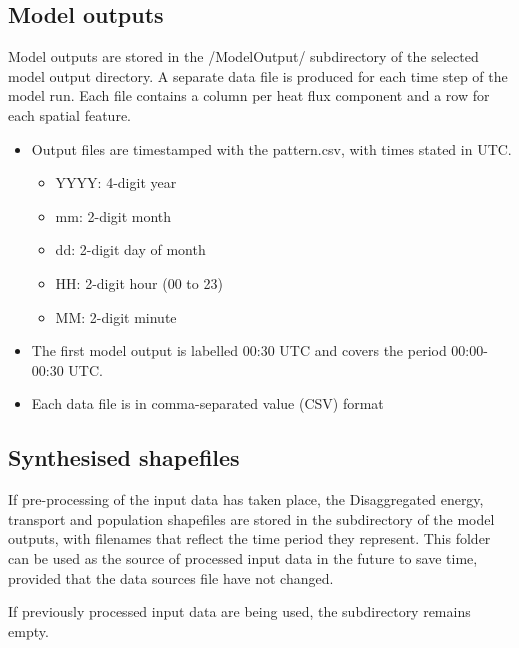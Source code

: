 \documentclass[letterpaper,10pt,english]{sphinxmanual}
\begin{document}
\subsection{Model outputs}
\label{\detokenize{OtherManuals/GQF_Manual:model-outputs}}
Model outputs are stored in the /ModelOutput/ subdirectory of the
selected model output directory. A separate data file is produced for
each time step of the model run. Each file contains a column per heat
flux component and a row for each spatial feature.
\begin{itemize}
\item {} 
Output files are timestamped with the
pattern.csv, with times stated in UTC.
\begin{itemize}
\item {} 
YYYY: 4-digit year

\item {} 
mm: 2-digit month

\item {} 
dd: 2-digit day of month

\item {} 
HH: 2-digit hour (00 to 23)

\item {} 
MM: 2-digit minute

\end{itemize}

\item {} 
The first model output is labelled 00:30 UTC and covers the period
00:00-00:30 UTC.

\item {} 
Each data file is in comma-separated value (CSV) format

\end{itemize}


\subsection{Synthesised shapefiles}
\label{\detokenize{OtherManuals/GQF_Manual:synthesised-shapefiles}}
If pre-processing of the input data has taken place, the Disaggregated
energy, transport and population shapefiles are stored in the
 subdirectory of the model outputs, with filenames
that reflect the time period they represent. This folder can be used as
the source of processed input data in the future to save time, provided
that the data sources file have not changed.

If previously processed input data are being used, the
 subdirectory remains empty.
\end{document}
